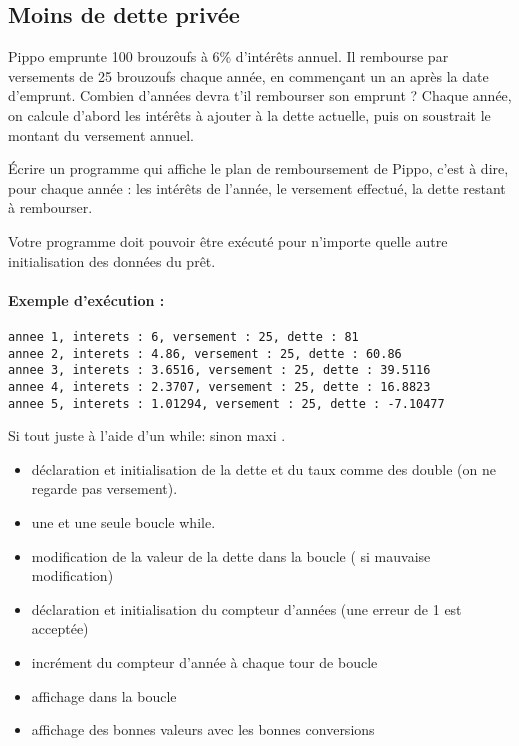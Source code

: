 \subsection{Moins de dette privée}

Pippo emprunte 100 brouzoufs à 6\% d'intérêts annuel. Il rembourse
par versements de 25 brouzoufs chaque année, en commençant un an après
la date d'emprunt. Combien d'années devra t'il rembourser son emprunt
?  Chaque année, on calcule d'abord les intérêts à ajouter à la dette
actuelle, puis on soustrait le montant du versement annuel.

\question Écrire un programme qui affiche le plan de remboursement de
Pippo, c'est à dire, pour chaque année : les intérêts de l'année, le
versement effectué, la dette restant à rembourser.

Votre programme doit pouvoir être exécuté pour n'importe quelle autre
initialisation des données du prêt.



\paragraph{Exemple d'exécution :}
\begin{small}
\begin{verbatim}
annee 1, interets : 6, versement : 25, dette : 81
annee 2, interets : 4.86, versement : 25, dette : 60.86
annee 3, interets : 3.6516, versement : 25, dette : 39.5116
annee 4, interets : 2.3707, versement : 25, dette : 16.8823
annee 5, interets : 1.01294, versement : 25, dette : -7.10477
\end{verbatim}
\end{small}

\begin{correction}
  \begin{small}
  \end{small}
  
  \begin{baremeenv}
Si tout juste à l'aide d'un while:  sinon maxi .
    \begin{itemize}
      \item {}  déclaration et initialisation de la dette et
        du taux comme des double (on ne regarde pas versement).
      \item {} une et une seule boucle while.
      \item {} modification de la valeur de la dette dans la
        boucle ( si mauvaise modification)
      \item {} déclaration et initialisation du compteur
        d'années (une erreur de 1 est acceptée)
      \item {} incrément du compteur d'année à chaque tour de boucle
  \item {} affichage dans la boucle
    \item {} affichage des bonnes valeurs avec les bonnes conversions
    \end{itemize}
  \end{baremeenv}
\end{correction}

